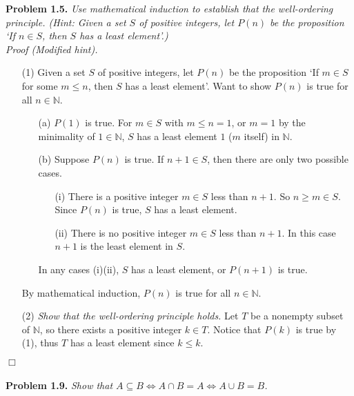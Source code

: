 \documentclass{article}
\begin{document}
\textbf{Problem 1.5.}
\emph{Use mathematical induction to establish
that the well-ordering principle.
(Hint: Given a set $S$ of positive integers,
let $P(n)$ be the proposition
`If $n \in S$, then $S$ has a least element'.)} \\

\emph{Proof (Modified hint).}
\begin{enumerate}
\item[(1)]
Given a set $S$ of positive integers,
let $P(n)$ be the proposition
`If $m \in S$ for some $m \leq n$, then $S$ has a least element'.
Want to show $P(n)$ is true for all $n \in \mathbb{N}$.
\begin{enumerate}
\item[(a)]
$P(1)$ is true.
For $m \in S$ with $m \leq n = 1$,
or $m = 1$ by the minimality of $1 \in \mathbb{N}$,
$S$ has a least element $1$ ($m$ itself) in $\mathbb{N}$.
\item[(b)]
Suppose $P(n)$ is true.
If $n+1 \in S$, then there are only two possible cases.
  \begin{enumerate}
  \item[(i)]
  There is a positive integer $m \in S$ less than $n+1$.
  So $n \geq m \in S$.
  Since $P(n)$ is true, $S$ has a least element.
  \item[(ii)]
  There is no positive integer $m \in S$ less than $n+1$.
  In this case $n+1$ is the least element in $S$.
  \end{enumerate}
  In any cases (i)(ii), $S$ has a least element, or $P(n+1)$ is true.
\end{enumerate}
By mathematical induction, $P(n)$ is true for all $n \in \mathbb{N}$.
\item[(2)]
\emph{Show that the well-ordering principle holds.}
Let $T$ be a nonempty subset of $\mathbb{N}$,
so there exists a positive integer $k \in T$.
Notice that $P(k)$ is true by (1),
thus $T$ has a least element since $k \leq k$.
\end{enumerate}
$\Box$ \\\\



\textbf{Problem 1.9.}
\emph{Show that
$A \subseteq B
\Leftrightarrow A \cap B = A
\Leftrightarrow A \cup B = B$.} \\
\end{document}
